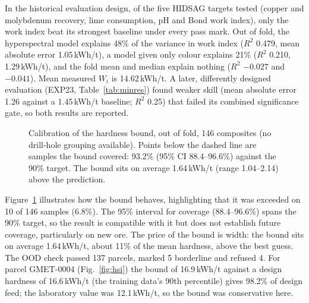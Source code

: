 \documentclass[10pt,a4paper,twocolumn]{article}
\newcommand{\Wi}{$W_i$}
\begin{document}
In the historical evaluation design, of the five HIDSAG targets tested (copper and molybdenum recovery, lime consumption, pH and Bond work index), only the work index beat its strongest baseline under every pass mark. Out of fold, the hyperspectral model explains 48\% of the variance in work index ($R^2$ 0.479, mean absolute error 1.05\,kWh/t), a model given only colour explains 21\% ($R^2$ 0.210, 1.29\,kWh/t), and the fold mean and median explain nothing ($R^2$ $-0.027$ and $-0.041$). Mean measured \Wi{} is 14.62\,kWh/t. A later, differently designed evaluation (EXP23, Table~\ref{tab:minres}) found weaker skill (mean absolute error 1.26 against a 1.45\,kWh/t baseline; $R^2$ 0.25) that failed its combined significance gate, so both results are reported.



\begin{figure}[t]
\centering
{}
\caption{Calibration of the hardness bound, out of fold, 146 composites (no drill-hole grouping available). Points below the dashed line are samples the bound covered: 93.2\% (95\% CI 88.4--96.6\%) against the 90\% target. The bound sits on average 1.64\,kWh/t (range 1.04--2.14) above the prediction.}
\label{fig:calibration}
\end{figure}

Figure~\ref{fig:calibration} illustrates how the bound behaves, highlighting that it was exceeded on 10 of 146 samples (6.8\%). The 95\% interval for coverage (88.4--96.6\%) spans the 90\% target, so the result is compatible with it but does not establish future coverage, particularly on new ore. The price of the bound is width: the bound sits on average 1.64\,kWh/t, about 11\% of the mean hardness, above the best guess. The OOD check passed 137 parcels, marked 5 borderline and refused 4. For parcel GMET-0004 (Fig.~\ref{fig:hsi}) the bound of 16.9\,kWh/t against a design hardness of 16.6\,kWh/t (the training data's 90th percentile) gives 98.2\% of design feed; the laboratory value was 12.1\,kWh/t, so the bound was conservative here.
\end{document}
